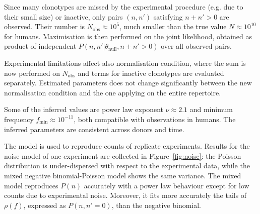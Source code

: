 \documentclass[a4paper,twocolumn]{article}
\begin{document}
Since many clonotypes are missed by the experimental procedure (e.g. due to their small size) or inactive, only pairs $(n, n')$ satisfying $n + n' > 0$ are observed. Their number is $N_\mathrm{obs} \approx 10^5$, much smaller than the true value $N \approx 10^{10}$ for humans. Maximisation is then performed on the joint likelihood, obtained as product of independent $P(n, n'|\theta_\mathrm{null}, n + n' > 0)$ over all observed pairs.

Experimental limitations affect also normalisation condition, where the sum is now performed on $N_\mathrm{obs}$ and terms for inactive clonotypes are evaluated separately. Estimated parameters does not change significantly between the new normalisation condition
and the one applying on the entire repertoire.

Some of the inferred values are power law exponent $\nu \approx 2.1$ and minimum frequency $f_\mathrm{min} \approx 10^{-11}$, both compatible with observations in humans. The inferred parameters are consistent across donors and time.

The model is used to reproduce counts of replicate experiments. Results for the noise model of one experiment are collected in Figure~\ref{fig:noise}: the Poisson distribution is under-dispersed with respect to the experimental data, while the mixed negative binomial-Poisson model shows the same variance. The mixed model reproduces $P(n)$ accurately with a power law behaviour except for low counts due to experimental noise. Moreover, it fits more accurately the tails of $\rho(f)$, expressed as $P(n, n' = 0)$, than the negative binomial.

\end{document}
